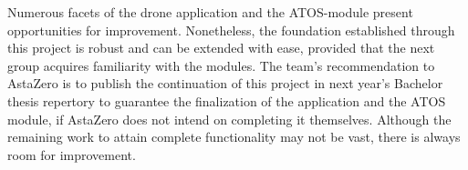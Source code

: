 Numerous facets of the drone application and the ATOS-module  present opportunities for improvement. Nonetheless, the foundation established through this project is robust and can be extended with ease, provided that the next group acquires familiarity with the modules. The team's recommendation to AstaZero is to publish the continuation of this project in next year's Bachelor thesis repertory to guarantee the finalization of the application and the ATOS module, if AstaZero does not intend on completing it themselves. Although the remaining work to attain complete functionality may not be vast, there is always room for improvement.
